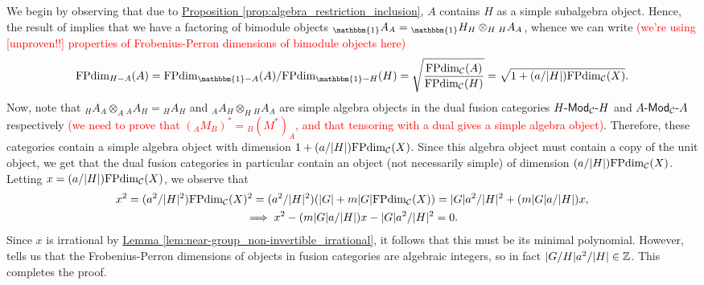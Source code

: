 \documentclass[12pt, reqno]{amsart}
\numberwithin{equation}{section}
\theoremstyle{plainspace}
\theoremstyle{definitionspace}
\theoremstyle{remarkspace}
\renewenvironment{proof}{{\noindent\textbf{Proof.}}}{\null\hfill\qedsymbol}
\DeclarePairedDelimiter{\abs}{\lvert}{\rvert}
\newcommand{\mathcat}[1]{\mathcal{#1}}
\newcommand{\textcat}[1]{\textup{\textsf{#1}}}
\newcommand{\bimodcat}[3][]{#2\textcat{-Mod}_{#1}\textcat{-}#3}
\newcommand{\FPdim}{\textup{FPdim}}
\begin{document}
\begin{proof}
We begin by observing that due to \hyperref[prop:algebra_restriction_inclusion]{Proposition \ref*{prop:algebra_restriction_inclusion}}, $A$ contains $H$ as a simple subalgebra object. Hence, the result of \cite[Exercise 7.8.22]{Etingof_2016} implies that we have a factoring of bimodule objects ${_{\mathbbm{1}}}A_A = {_{\mathbbm{1}}}H_H \otimes_H {_H}A_A$, whence we can write \textcolor{red}{(we're using [unproven!!] properties of Frobenius-Perron dimensions of bimodule objects here)}
\begin{align*}
\begin{split}
\FPdim_{H-A}(A) = \FPdim_{\mathbbm{1}-A}(A)/\FPdim_{\mathbbm{1}-H}(H) = \sqrt{\frac{\FPdim_{\mathcat{C}}(A)}{\FPdim_{\mathcat{C}}(H)}} = \sqrt{1 + (a/\abs{H})\FPdim_{\mathcat{C}}(X)}.
\end{split}
\end{align*}
\noindent Now, note that ${_H}A_A \otimes_A {_A}A_H = {_H}A_H$ and ${_A}A_H \otimes_H {_H}A_A$ are simple algebra objects in the dual fusion categories $\bimodcat[\mathcat{C}]{H}{H}$ and $\bimodcat[\mathcat{C}]{A}{A}$ respectively \textcolor{red}{(we need to prove that $({_A}M_B)^{*} = {_B}(M^{*})_A$, and that tensoring with a dual gives a simple algebra object)}. Therefore, these categories contain a simple algebra object with dimension $1 + (a/\abs{H})\FPdim_{\mathcat{C}}(X)$. Since this algebra object must contain a copy of the unit object, we get that the dual fusion categories in particular contain an object (not necessarily simple) of dimension $(a/\abs{H})\FPdim_{\mathcat{C}}(X)$. Letting $x = (a/\abs{H})\FPdim_{\mathcat{C}}(X)$, we observe that
\begin{gather*}
x^2 = (a^2/\abs{H}^2)\FPdim_{\mathcat{C}}(X)^2 = (a^2/\abs{H}^2)(\abs{G} + m\abs{G}\FPdim_{\mathcat{C}}(X)) = \abs{G}a^2/\abs{H}^2 + (m\abs{G}a/\abs{H})x, \\
\implies x^2 - (m\abs{G}a/\abs{H})x - \abs{G}a^2/\abs{H}^2 = 0.
\end{gather*}
\noindent Since $x$ is irrational by \hyperref[lem:near-group_non-invertible_irrational]{Lemma \ref*{lem:near-group_non-invertible_irrational}}, it follows that this must be its minimal polynomial. However, \cite[Corollary 8.54]{Etingof_2005} tells us that the Frobenius-Perron dimensions of objects in fusion categories are algebraic integers, so in fact $\abs{G/H}a^2/\abs{H} \in \mathbb{Z}$. This completes the proof.
\end{proof}
\newline
\end{document}
